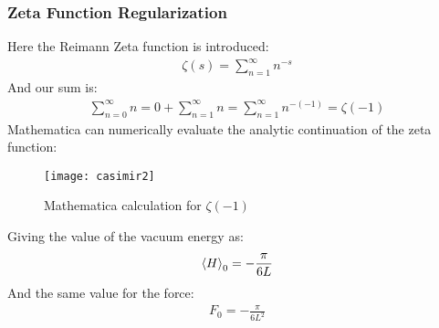 \documentclass[12pt]{article}
\begin{document}
\subsubsection{Zeta Function Regularization}
Here the Reimann Zeta function is introduced:
\begin{align*}
  \zeta(s)=\sum_{n=1}^\infty n^{-s}
\end{align*}
And our sum is:
\begin{align*}
  \sum_{n=0}^\infty n=0+\sum_{n=1}^\infty n=\sum_{n=1}^\infty n^{-(-1)}=\zeta(-1)
\end{align*}
Mathematica can numerically evaluate the analytic continuation of the zeta function:
\begin{figure}[H]
  \centering
  \texttt{[image: casimir2]}
  \caption{Mathematica calculation for $\zeta(-1)$}
\end{figure}
Giving the value of the vacuum energy as:
\begin{align*}
  \ev{H}_0=-\frac{\pi}{6L}
\end{align*}
And the same value for the force:
\begin{align}
  \boxed{F_0=-\frac{\pi}{6L^2}}
\end{align}
\end{document}
